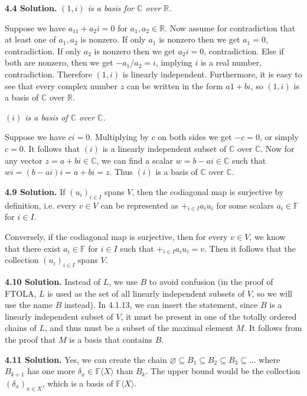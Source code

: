\textbf{4.4 Solution.} \textit{$(1,i)$ is a basis for $\mathbb{C}$ over $\mathbb{R}$.}

Suppose we have $a_11 + a_2i = 0$ for $a_1,a_2 \in \mathbb{R}$. Now assume for contradiction that at least one of $a_1, a_2$ is nonzero. If only $a_1$ is nonzero then we get $a_1 = 0$, contradiction. If only $a_2$ is nonzero then we get $a_2i = 0$, contradiction. Else if both are nonzero, then we get $-a_1/a_2 = i$, implying $i$ is a real number, contradiction. Therefore $(1, i)$ is linearly independent. Furthermore, it is easy to see that every complex number $z$ can be written in the form $a1 + bi$, so $(1, i)$ is a basis of $\mathbb{C}$ over $\mathbb{R}$.

\textit{$(i)$ is a basis of $\mathbb{C}$ over $\mathbb{C}$.}

Suppose we have $ci = 0$. Multiplying by $c$ on both sides we get $-c = 0$, or simply $c = 0$. It follows that $(i)$ is a linearly independent subset of $\mathbb{C}$ over $\mathbb{C}$. Now for any vector $z = a + bi \in \mathbb{C}$, we can find a scalar $w = b - ai \in \mathbb{C}$ such that $wi = (b - ai)i = a + bi = z$. Thus $(i)$ is a basis of $\mathbb{C}$ over $\mathbb{C}$.

\textbf{4.9 Solution.} If $(u_i)_{i \in I}$ spans $V$, then the codiagonal map is surjective by definition, i.e. every $v \in V$ can be represented as $+_{i \in I}a_iu_i$ for some scalars $a_i \in \mathbb{F}$ for $i \in I$.

Conversely, if the codiagonal map is surjective, then for every $v \in V$, we know that there exist $a_i \in \mathbb{F}$ for $i \in I$ such that $+_{i \in I}a_iu_i = v$. Then it follows that the collection $(u_i)_{i \in I}$ spans $V$.

\textbf{4.10 Solution.} Instead of $L$, we use $B$ to avoid confusion (in the proof of FTOLA, $L$ is used as the set of all linearly independent subsets of $V$, so we will use the name $B$ instead). In 4.1.13, we can insert the statement, since $B$ is a linearly independent subset of $V$, it must be present in one of the totally ordered chains of $L$, and thus must be a subset of the maximal element $M$. It follows from the proof that $M$ is a basis that contains $B$.

\textbf{4.11 Solution.} Yes, we can create the chain $\varnothing \subseteq B_1 \subseteq B_2 \subseteq B_3 \subseteq ...$ where $B_{k+1}$ has one more $\delta_x \in \mathbb{F}\langle X \rangle$ than $B_k$. The upper bound would be the collection $(\delta_x)_{x \in X}$, which is a basis of $\mathbb{F}\langle X \rangle$.

